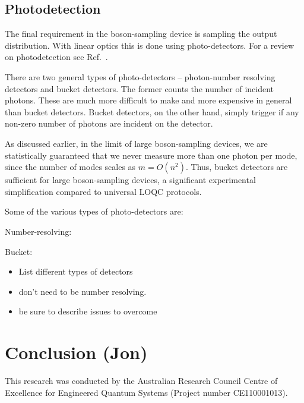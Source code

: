 \documentclass[aps,pra,twocolumn,amsmath,amssymb,nofootinbib,superscriptaddress]{revtex4}
\begin{document}
\subsection{Photodetection}

The final requirement in the boson-sampling device is sampling the output distribution. With linear optics this is done using photo-detectors. For a review on photodetection see Ref.~\cite{bib:SourceAndDetectorReview}.  

There are two general types of photo-detectors -- photon-number resolving detectors and bucket detectors. The former counts the number of incident photons. These are much more difficult to make and more expensive in general than bucket detectors. Bucket detectors, on the other hand, simply trigger if any non-zero number of photons are incident on the detector.

As discussed earlier, in the limit of large boson-sampling devices, we are statistically guaranteed that we never measure more than one photon per mode, since the number of modes scales as \mbox{$m=O(n^2)$}. Thus, bucket detectors are sufficient for large boson-sampling devices, a significant experimental simplification compared to universal LOQC protocols.

Some of the various types of photo-detectors are:

Number-resolving:

Bucket:


\begin{itemize}
\item List different types of detectors
\item don't need to be number resolving.
\item be sure to describe issues to overcome
\end{itemize}

\section{Conclusion (Jon)}

%
%

\begin{acknowledgments}
This research was conducted by the Australian Research Council Centre of Excellence for Engineered Quantum Systems (Project number CE110001013).
\end{acknowledgments}

%
%


\end{document}
